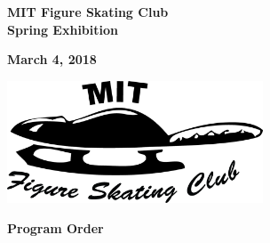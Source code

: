 \documentclass[12pt]{article}
\newcommand{\programnumber}[2]{{
  \vspace{0.1in}
  \textbf{#1}\\
  {\footnotesize #2}
}}
\begin{document}
\begin{multicols*}{2}
\begin{center}
{\Large \textbf{MIT Figure Skating Club}}\\
{\Large \textbf{Spring Exhibition}}

\vspace{0.2in}

{\large\textbf{March 4, 2018}}

\vspace{0.7in}

\includegraphics[width=3in]{fsclogo.png}

\end{center}

\vfill\null
\columnbreak


\begin{center}

{\large \textbf{Program Order}}



\end{center}
\end{multicols*}
\end{document}
